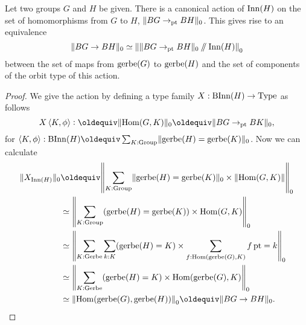 \begin{theorem}
  Let two groups $G$ and $H$ be given.
  There is a canonical action of $\Inn(H)$
  on the set of homomorphisms from $G$ to $H$, $\Trunc{BG \to_\pt BH}_0$.
  This gives rise to an equivalence
  \[
    \Trunc{BG \to BH}_0 \equiv \Trunc*{\Trunc{BG \to_\pt BH}_0 \dblslash \Inn(H)}_0
  \]
  between the set of maps from $\gerbe(G)$ to $\gerbe(H)$ and the set of
  components of the orbit type of this action.
\end{theorem}
\begin{proof}
  We give the action by defining a type family $X : \B\Inn(H) \to \Type$ as follows
  \[
    X\, \angled{K,\phi} \defeq \Trunc{\Hom(G,K)}_0 \jdeq \Trunc{BG \to_\pt BK}_0,
  \]
  for $\angled{K,\phi} : \B\Inn(H) \jdeq \sum_{K : \Group} \Trunc{\gerbe(H) = \gerbe(K)}_0$.
  Now we can calculate
  \begin{align*}
    \Trunc{X_{\Inn(H)}}_0
    &\jdeq \Trunc*{\sum_{K:\Group}\Trunc{\gerbe(H)=\gerbe(K)}_0\times\Trunc{\Hom(G,K)}}_0 \\
    &\equiv \Trunc*{\sum_{K:\Group}(\gerbe(H)=\gerbe(K))\times\Hom(G,K)}_0 \\
    &\equiv \Trunc*{\sum_{K:\Gerbe}\sum_{k:K}(\gerbe(H)=K)\times\sum_{f:\Hom(\gerbe(G),K)}\mathop f \pt = k}_0 \\
    &\equiv \Trunc*{\sum_{K:\Gerbe} (\gerbe(H)=K) \times\Hom(\gerbe(G),K)}_0 \\
    &\equiv \Trunc*{\Hom(\gerbe(G),\gerbe(H))}_0 \jdeq \Trunc{BG \to BH}_0.\qedhere
  \end{align*}
\end{proof}
